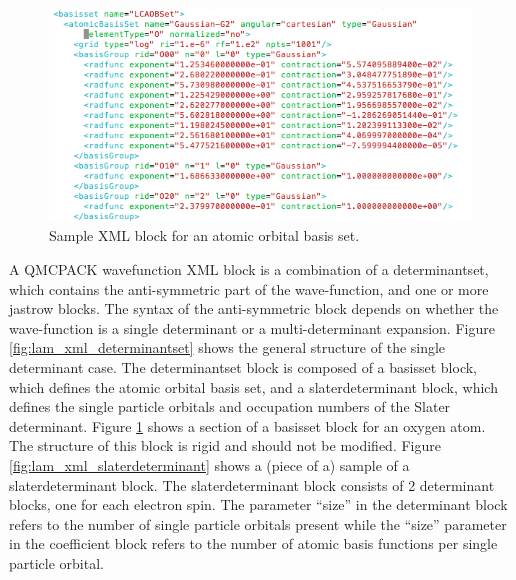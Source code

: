 \begin{figure}[ht!]
\begin{center}
\includegraphics[trim = 0mm 0mm 0mm 0mm, clip,width=1.0\columnwidth]{figures/lab_advanced_molecules_xml_basisset.png}
\end{center}
\caption{Sample XML block for an atomic orbital basis set.}
\label{fig:lam_xml_basisset}
\end{figure}

A QMCPACK wavefunction XML block is a combination of a determinantset, which
contains the anti-symmetric part of the wave-function, and one or more jastrow blocks.
The syntax of the anti-symmetric block depends on whether the wave-function is a single
determinant or a multi-determinant expansion. Figure \ref{fig:lam_xml_determinantset} 
shows the general structure of the
single determinant case. The determinantset block is composed of a basisset block, which
defines the atomic orbital basis set, and a slaterdeterminant block, which defines the single
particle orbitals and occupation numbers of the Slater determinant. Figure \ref{fig:lam_xml_basisset} 
shows a section
of a basisset block for an oxygen atom. The structure of this block is rigid and should not
be modified. Figure \ref{fig:lam_xml_slaterdeterminant} shows a (piece of a) sample of a 
slaterdeterminant block. The
slaterdeterminant block consists of 2 determinant blocks, one for each electron spin. The
parameter “size” in the determinant block refers to the number of single particle orbitals
present while the “size” parameter in the coefficient block refers to the number of atomic
basis functions per single particle orbital.

